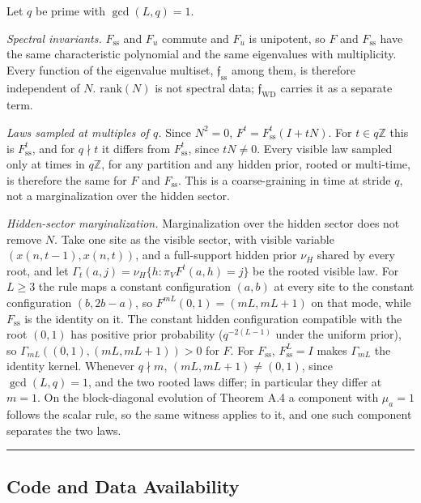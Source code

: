 \documentclass[
]{article}
\begin{document}
Let \(q\) be prime with \(\gcd(L, q) = 1\).

\emph{Spectral invariants.} \(F_{\mathrm{ss}}\) and \(F_u\) commute and
\(F_u\) is unipotent, so \(F\) and \(F_{\mathrm{ss}}\) have the same
characteristic polynomial and the same eigenvalues with multiplicity.
Every function of the eigenvalue multiset,
\(\mathfrak{f}_{\mathrm{ss}}\) among them, is therefore independent of
\(N\). \(\mathrm{rank}(N)\) is not spectral data;
\(\mathfrak{f}_{\mathrm{WD}}\) carries it as a separate term.

\emph{Laws sampled at multiples of \(q\).} Since \(N^2 = 0\),
\(F^t = F_{\mathrm{ss}}^t (I + tN)\). For \(t \in q\mathbb{Z}\) this is
\(F_{\mathrm{ss}}^t\), and for \(q \nmid t\) it differs from
\(F_{\mathrm{ss}}^t\), since \(tN \neq 0\). Every visible law sampled
only at times in \(q\mathbb{Z}\), for any partition and any hidden
prior, rooted or multi-time, is therefore the same for \(F\) and
\(F_{\mathrm{ss}}\). This is a coarse-graining in time at stride \(q\),
not a marginalization over the hidden sector.

\emph{Hidden-sector marginalization.} Marginalization over the hidden
sector does not remove \(N\). Take one site as the visible sector, with
visible variable \((x(n, t-1), x(n, t))\), and a full-support hidden
prior \(\nu_H\) shared by every root, and let
\(\Gamma_t(a, j) = \nu_H\{h : \pi_V F^t(a, h) = j\}\) be the rooted
visible law. For \(L \geq 3\) the rule maps a constant configuration
\((a, b)\) at every site to the constant configuration \((b, 2b - a)\),
so \(F^{mL}(0, 1) = (mL, mL + 1)\) on that mode, while
\(F_{\mathrm{ss}}\) is the identity on it. The constant hidden
configuration compatible with the root \((0, 1)\) has positive prior
probability (\(q^{-2(L-1)}\) under the uniform prior), so
\(\Gamma_{mL}((0,1), (mL, mL+1)) > 0\) for \(F\). For
\(F_{\mathrm{ss}}\), \(F_{\mathrm{ss}}^{L} = I\) makes \(\Gamma_{mL}\)
the identity kernel. Whenever \(q \nmid m\),
\((mL, mL + 1) \neq (0, 1)\), since \(\gcd(L, q) = 1\), and the two
rooted laws differ; in particular they differ at \(m = 1\). On the
block-diagonal evolution of Theorem A.4 a component with \(\mu_a = 1\)
follows the scalar rule, so the same witness applies to it, and one such
component separates the two laws.

\begin{center}\rule{0.5\linewidth}{0.5pt}\end{center}

\hypertarget{code-and-data-availability}{%
\subsection{Code and Data
Availability}\label{code-and-data-availability}}
\end{document}
